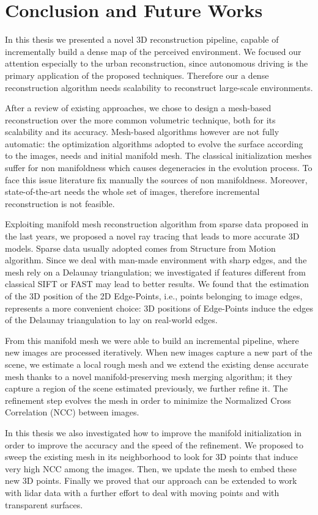 \chapter{Conclusion and Future Works}
\label{ch:future_works}
In this thesis we presented a novel 3D reconstruction pipeline, capable of incrementally build a dense map of the perceived environment.
We focused our attention especially to the urban reconstruction, since autonomous driving is the primary application of the proposed techniques.
Therefore our a dense reconstruction algorithm needs scalability to reconstruct large-scale environments.


After a review of existing approaches, we chose to design a mesh-based reconstruction over the more common volumetric technique, both for its scalability and its accuracy. 
Mesh-based algorithms however are not fully automatic: the optimization algorithms adopted to evolve the surface according to the images, needs and initial manifold mesh. 
The classical initialization meshes suffer for non manifoldness which causes degeneracies in the evolution process. 
To face this issue literature fix manually the sources of non manifoldness. 
Moreover,  state-of-the-art  needs the whole set of images, therefore incremental reconstruction is not feasible.

Exploiting  manifold mesh reconstruction algorithm from sparse data proposed in the last years, we proposed a  novel ray tracing that leads to more accurate 3D models. 
Sparse data usually adopted comes from Structure from Motion algorithm.  
Since we deal with man-made environment with sharp edges, and the mesh rely on a Delaunay triangulation; we investigated if features different from classical SIFT or FAST may lead to better results. 
We found that the estimation of the 3D position of the 2D Edge-Points, i.e., points belonging to image edges, represents a more convenient choice: 3D positions of Edge-Points induce the edges of the Delaunay triangulation to lay on real-world edges.

From this manifold mesh we were able to build an incremental pipeline, where new images are processed iteratively.
When new images  capture a new part of the scene, we estimate a local rough mesh and we extend the existing dense accurate mesh thanks to a novel manifold-preserving mesh merging algorithm; it they capture a region of the scene estimated previously, we further refine it.
The refinement step evolves the mesh in order to minimize the Normalized Cross Correlation (NCC) between images.

In this thesis we also investigated how to improve the manifold initialization in order to improve the accuracy and the speed of the refinement. 
We proposed to sweep the existing mesh in its neighborhood to look for 3D points that induce very high NCC among the images. Then, we  update the mesh to embed these new 3D points.
Finally we proved that our approach can be extended to work with lidar data with a further effort to deal with moving points and with transparent surfaces.



